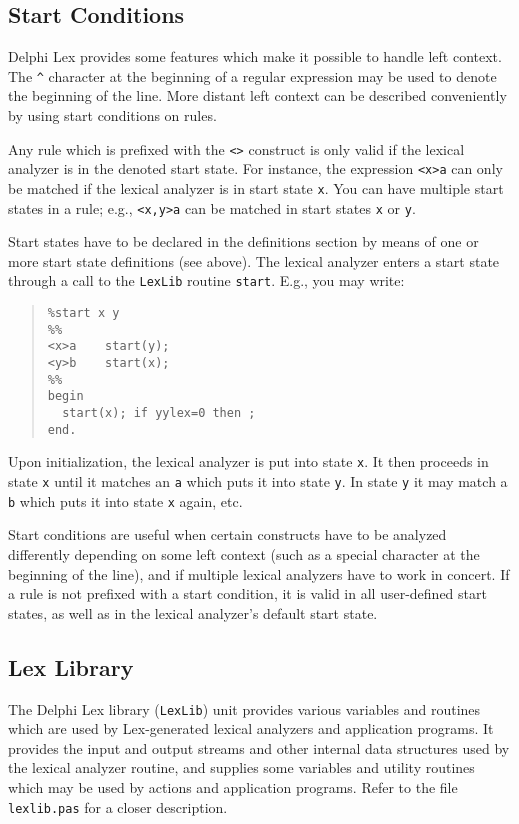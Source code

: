 \documentclass{article}
\begin{document}
\subsection{Start Conditions}

Delphi Lex provides some features which make it possible to handle left context.
The \verb"^" character at the beginning of a regular expression may be used
to denote the beginning of the line. More distant left context can be described
conveniently by using start conditions on rules.

Any rule which is prefixed with the \verb"<>" construct is only valid if the
lexical analyzer is in the denoted start state. For instance, the expression
\verb"<x>a" can only be matched if the lexical analyzer is in start state
\verb"x". You can have multiple start states in a rule; e.g., \verb"<x,y>a"
can be matched in start states \verb"x" or \verb"y".

Start states have to be declared in the definitions section by means of
one or more start state definitions (see above). The lexical analyzer enters
a start state through a call to the \verb"LexLib" routine \verb"start". E.g.,
you may write:

\begin{quote}\begin{verbatim}
%start x y
%%
<x>a    start(y);
<y>b    start(x);
%%
begin
  start(x); if yylex=0 then ;
end.
\end{verbatim}\end{quote}

Upon initialization, the lexical analyzer is put into state \verb"x". It then
proceeds in state \verb"x" until it matches an \verb"a" which puts it into
state \verb"y". In state \verb"y" it may match a \verb"b" which puts it into
state \verb"x" again, etc.

Start conditions are useful when certain constructs have to be analyzed
differently depending on some left context (such as a special character
at the beginning of the line), and if multiple lexical analyzers have to
work in concert. If a rule is not prefixed with a start condition, it is
valid in all user-defined start states, as well as in the lexical analyzer's
default start state.

\subsection{Lex Library}

The Delphi Lex library (\verb"LexLib") unit provides various variables and
routines which are used by Lex-generated lexical analyzers and application
programs. It provides the input and output streams and other internal data
structures used by the lexical analyzer routine, and supplies some variables
and utility routines which may be used by actions and application programs.
Refer to the file \verb"lexlib.pas" for a closer description.
\end{document}
